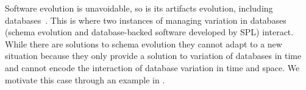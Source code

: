 Software evolution is unavoidable, so is its artifacts evolution, 
including databases~\cite{dbSPLevolve}.
This is where two instances of managing 
variation in databases (schema evolution and database-backed software 
developed by SPL) interact.
While there are solutions to schema evolution
they cannot adapt to a new situation because they only provide a solution to
variation of databases in time and cannot encode the interaction of database variation in
time and space.
We motivate this case through an example in .

